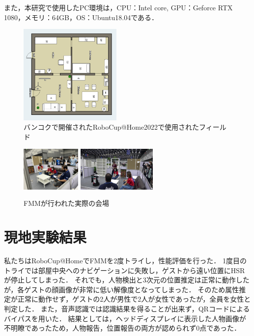 \documentclass[a4j]{jarticle}
\begin{document}
また，本研究で使用したPC環境は，CPU：Intel core, GPU：Geforce RTX 1080，メモリ：64GB，OS：Ubuntu18.04である．
\begin{figure}[ht]
  \centering
  \includegraphics[width=5cm]{images/robocup/arenaBangkok_rotate.png}
  \caption{バンコクで開催されたRoboCup@Home2022で使用されたフィールド}
  \label{robocup_field}
\end{figure}
\begin{figure}[ht]
  \centering
  \includegraphics[height=2.2cm]{images/robocup/FMM_onsite_overview_1.jpg}
  \includegraphics[height=2.2cm]{images/robocup/FMM_onsite_overview_3.jpg}
  \caption{FMMが行われた実際の会場}
  \label{onsite_overview_1}
\end{figure}


\section{現地実験結果}
私たちはRoboCup@HomeでFMMを2度トライし，性能評価を行った．
1度目のトライでは部屋中央へのナビゲーションに失敗し，ゲストから遠い位置にHSRが停止してしまった．
それでも，人物検出と3次元の位置推定は正常に動作したが，各ゲストの顔画像が非常に低い解像度となってしまった．
そのため属性推定が正常に動作せず，ゲストの2人が男性で2人が女性であったが，全員を女性と判定した．
また，音声認識では認識結果を得ることが出来ず，QRコードによるバイパスを用いた．
結果としては，ヘッドディスプレイに表示した人物画像が不明瞭であったため，人物報告，位置報告の両方が認められず0点であった．
\end{document}
